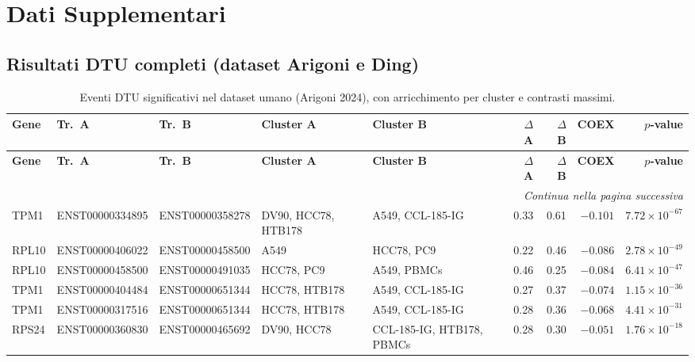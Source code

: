 \chapter{Dati Supplementari}
\thispagestyle{empty}
\section{Risultati DTU completi (dataset Arigoni e Ding)}

\pagestyle{empty}

\bigskip

\begin{landscape}
\begingroup
\footnotesize
\setlength{\tabcolsep}{4.5pt}
\begin{longtable}{@{} l l l >{\raggedright\arraybackslash}p{3.4cm} >{\raggedright\arraybackslash}p{3.4cm} r r r r @{}}
\caption{Eventi DTU significativi nel dataset umano (Arigoni 2024), con arricchimento per cluster e contrasti massimi.\label{tab:arrigoni_landscape}}\\
\toprule
\textbf{Gene} & \textbf{Tr.~A} & \textbf{Tr.~B} & \textbf{Cluster A} & \textbf{Cluster B} & \textbf{$\Delta$ A} & \textbf{$\Delta$ B} & \textbf{COEX} & \textbf{$p$-value} \\
\midrule
\endfirsthead
\toprule
\textbf{Gene} & \textbf{Tr.~A} & \textbf{Tr.~B} & \textbf{Cluster A} & \textbf{Cluster B} & \textbf{$\Delta$ A} & \textbf{$\Delta$ B} & \textbf{COEX} & \textbf{$p$-value} \\
\midrule
\endhead
\midrule
\multicolumn{9}{r}{\textit{Continua nella pagina successiva}} \\
\endfoot
\bottomrule
\endlastfoot
TPM1   & ENST00000334895 & ENST00000358278 & DV90, HCC78, HTB178 & A549, CCL-185-IG & 0.33 & 0.61 & $-0.101$ & $7.72 \times 10^{-67}$ \\
RPL10  & ENST00000406022 & ENST00000458500 & A549 & HCC78, PC9 & 0.22 & 0.46 & $-0.086$ & $2.78 \times 10^{-49}$ \\
RPL10  & ENST00000458500 & ENST00000491035 & HCC78, PC9 & A549, PBMCs & 0.46 & 0.25 & $-0.084$ & $6.41 \times 10^{-47}$ \\
TPM1   & ENST00000404484 & ENST00000651344 & HCC78, HTB178 & A549, CCL-185-IG & 0.27 & 0.37 & $-0.074$ & $1.15 \times 10^{-36}$ \\
TPM1   & ENST00000317516 & ENST00000651344 & HCC78, HTB178 & A549, CCL-185-IG & 0.28 & 0.36 & $-0.068$ & $4.41 \times 10^{-31}$ \\
RPS24  & ENST00000360830 & ENST00000465692 & DV90, HCC78 & CCL-185-IG, HTB178, PBMCs & 0.28 & 0.30 & $-0.051$ & $1.76 \times 10^{-18}$ \\

\end{longtable}
\end{landscape}
